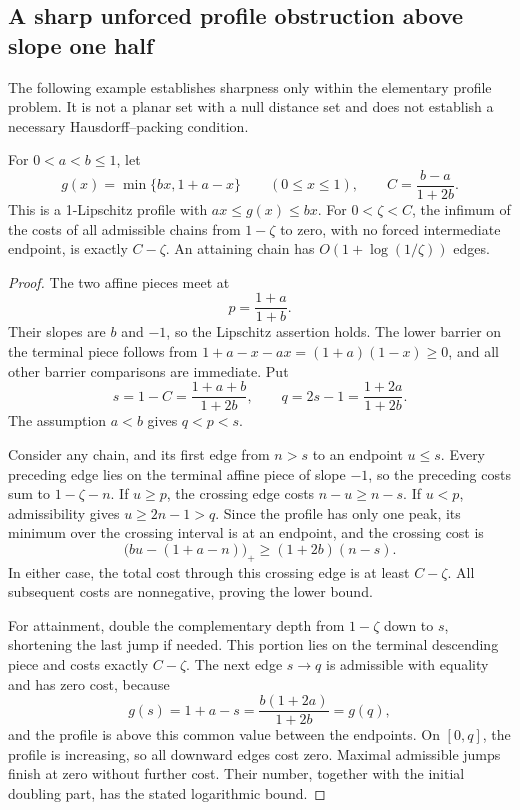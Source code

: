 \subsection{A sharp unforced profile obstruction above slope one half}
\label{unforced:obstruction-section}

The following example establishes sharpness only within the elementary
profile problem. It is not a planar set with a null distance set and does
not establish a necessary Hausdorff--packing condition.

\begin{proposition}\label{unforced:obstruction}
For \(0<a<b\le1\), let
$$
 g(x)=\min\{bx,1+a-x\}\qquad(0\le x\le1),
 \qquad C=\frac{b-a}{1+2b}.
$$
This is a 1-Lipschitz profile with \(ax\le g(x)\le bx\). For
\(0<\zeta<C\), the infimum of the costs of all admissible chains from
\(1-\zeta\) to zero, with no forced intermediate endpoint, is exactly
\(C-\zeta\). An attaining chain has
\(O(1+\log(1/\zeta))\) edges.
\end{proposition}

\begin{proof}
The two affine pieces meet at
$$
 p=\frac{1+a}{1+b}.
$$
Their slopes are \(b\) and \(-1\), so the Lipschitz assertion holds.
The lower barrier on the terminal piece follows from
\(1+a-x-ax=(1+a)(1-x)\ge0\), and all other barrier comparisons are
immediate. Put
$$
 s=1-C=\frac{1+a+b}{1+2b},\qquad
 q=2s-1=\frac{1+2a}{1+2b}.
$$
The assumption \(a<b\) gives \(q<p<s\).

Consider any chain, and its first edge from \(n>s\) to an endpoint
\(u\le s\). Every preceding edge lies on the terminal affine piece
of slope \(-1\), so the preceding costs sum to \(1-\zeta-n\).
If \(u\ge p\), the crossing edge costs \(n-u\ge n-s\). If
\(u<p\), admissibility gives \(u\ge2n-1>q\). Since the profile has
only one peak, its minimum over the crossing interval is at an endpoint,
and the crossing cost is
$$
 \bigl(bu-(1+a-n)\bigr)_+
 \ge(1+2b)(n-s).
$$
In either case, the total cost through this crossing edge is at least
\(C-\zeta\). All subsequent costs are nonnegative, proving the lower
bound.

For attainment, double the complementary depth from \(1-\zeta\)
down to \(s\), shortening the last jump if needed. This portion lies
on the terminal descending piece and costs exactly \(C-\zeta\).
The next edge \(s\to q\) is admissible with equality and has zero cost,
because
$$
 g(s)=1+a-s=\frac{b(1+2a)}{1+2b}=g(q),
$$
and the profile is above this common value between the endpoints. On
\([0,q]\), the profile is increasing, so all downward edges cost zero.
Maximal admissible jumps finish at zero without further cost. Their
number, together with the initial doubling part, has the stated
logarithmic bound.
\end{proof}

